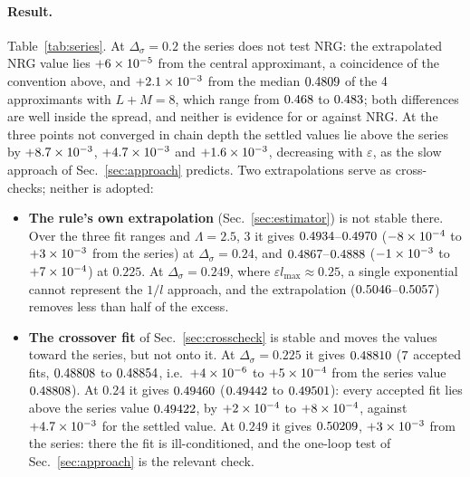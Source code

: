 \documentclass[10pt,a4paper]{article}
\newcommand{\Ds}{\Delta_\sigma}
\begin{document}
\paragraph{Result.} Table~\ref{tab:series}. At $\Ds=0.2$ the series does not test NRG: the extrapolated NRG value lies
$+6\times10^{-5}$ from the central approximant, a coincidence of the convention above, and $+2.1\times10^{-3}$ from the median
$0.4809$ of the $4$ approximants with $L+M=8$, which range from $0.468$ to
$0.483$; both differences are well inside the spread, and neither is evidence for or against NRG. At the three points not converged in chain depth the settled values lie above the series by $+8.7\times10^{-3}$,
$+4.7\times10^{-3}$ and $+1.6\times10^{-3}$, decreasing with $\varepsilon$, as the slow approach of Sec.~\ref{sec:approach} predicts.
Two extrapolations serve as cross-checks; neither is adopted:
\begin{itemize}
\item \textbf{The rule's own extrapolation} (Sec.~\ref{sec:estimator}) is not stable there. Over the three fit ranges and
  $\Lambda=2.5$, $3$ it gives $0.4934$--$0.4970$ ($-8\times10^{-4}$ to $+3\times10^{-3}$ from the series)
  at $\Ds=0.24$, and $0.4867$--$0.4888$ ($-1\times10^{-3}$ to $+7\times10^{-4}$) at
  $0.225$. At $\Ds=0.249$, where $\varepsilon l_{\max}\approx0.25$, a single exponential cannot represent the $1/l$ approach, and the
  extrapolation ($0.5046$--$0.5057$) removes less than half of the excess.
\item \textbf{The crossover fit} of Sec.~\ref{sec:crosscheck} is stable and moves the values toward the series, but not onto it. At
  $\Ds=0.225$ it gives $0.48810$ ($7$ accepted fits, $0.48808$ to
  $0.48854$, i.e.\ $+4\times10^{-6}$ to $+5\times10^{-4}$ from the series value
  $0.48808$). At $0.24$ it gives $0.49460$ ($0.49442$ to $0.49501$): every accepted fit
  lies above the series value $0.49422$, by $+2\times10^{-4}$ to $+8\times10^{-4}$, against $+4.7\times10^{-3}$ for
  the settled value. At $0.249$ it gives $0.50209$, $+3\times10^{-3}$ from the series: there the fit is
  ill-conditioned, and the one-loop test of Sec.~\ref{sec:approach} is the relevant check.
\end{itemize}
\end{document}

